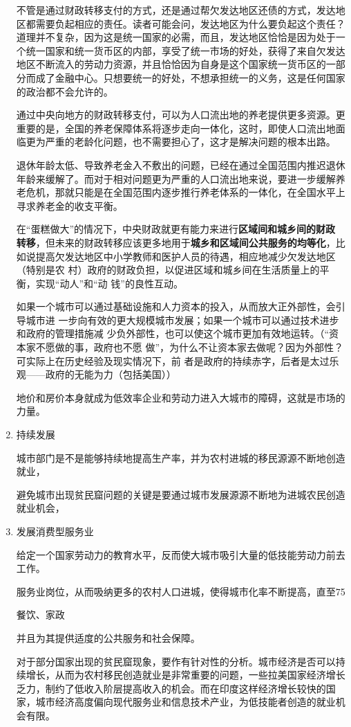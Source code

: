 \begin{enumerate}
不管是通过财政转移支付的方式，还是通过帮欠发达地区还债的方式，发达地区都需要负起相应的责任。读者可能会问，发达地区为什么要负起这个责任？道理并不复杂，因为这是统一国家的必需，而且，发达地区恰恰是因为处于一个统一国家和统一货币区的内部，享受了统一市场的好处，获得了来自欠发达地区不断流入的劳动力资源，并且恰恰因为自身是这个国家统一货币区的一部分而成了金融中心。只想要统一的好处，不想承担统一的义务，这是任何国家的政治都不会允许的。

通过中央向地方的财政转移支付，可以为人口流出地的养老提供更多资源。更重要的是，全国的养老保障体系将逐步走向一体化，这时，即使人口流出地面临更为严重的老龄化问题，也不需要担心了，这才是解决问题的根本出路。

退休年龄太低、导致养老金入不敷出的问题，已经在通过全国范围内推迟退休年龄来缓解了。而对于相对问题更为严重的人口流出地来说，要进一步缓解养老危机，那就只能是在全国范围内逐步推行养老体系的一体化，在全国水平上寻求养老金的收支平衡。


在“蛋糕做大”的情况下，中央财政就更有能力来进行\textbf{区域间和城乡间的财政
  转移}，但未来的财政转移应该更多地用于\textbf{城乡和区域间公共服务的均等化}，比
如说提高欠发达地区中小学教师和医护人员的待遇，相应地减少欠发达地区（特别是农
村）政府的财政负担，以促进区域和城乡间在生活质量上的平衡，实现“动人”和“动
钱”的良性互动。

如果一个城市可以通过基础设施和人力资本的投入，从而放大正外部性，会引导城市进
一步向有效的更大规模城市发展；如果一个城市可以通过技术进步和政府的管理措施减
少负外部性，也可以使这个城市更加有效地运转。（“资本家不愿做的事，政府也不愿
做”，为什么不让资本家去做呢？因为外部性？可实际上在历史经验及现实情况下，前
者是政府的持续赤字，后者是太过乐观——政府的无能为力（包括美国））


地价和房价本身就成为低效率企业和劳动力进入大城市的障碍，这就是市场的力量。

\item 持续发展


城市部门是不是能够持续地提高生产率，并为农村进城的移民源源不断地创造就业，


避免城市出现贫民窟问题的关键是要通过城市发展源源不断地为进城农民创造就业机会，

\item 发展消费型服务业

给定一个国家劳动力的教育水平，反而使大城市吸引大量的低技能劳动力前去工作。


服务业岗位，从而吸纳更多的农村人口进城，使得城市化率不断提高，直至75%

餐饮、家政


并且为其提供适度的公共服务和社会保障。

对于部分国家出现的贫民窟现象，要作有针对性的分析。城市经济是否可以持续增长，从而为农村移民创造就业是非常重要的问题，一些拉美国家经济增长乏力，制约了低收入阶层提高收入的机会。而在印度这样经济增长较快的国家，城市经济高度偏向现代服务业和信息技术产业，为低技能者创造的就业机会有限。

\end{enumerate}

